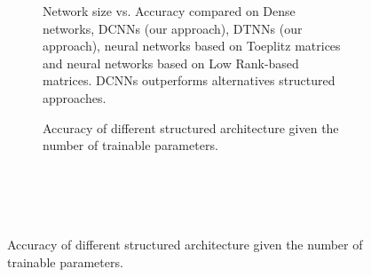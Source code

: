 


\begin{figure}
   \centering
   \begin{subfigure}[b]{0.49\textwidth}
       \centering
       
       \caption{Network size vs. Accuracy compared on Dense networks, DCNNs (our approach), DTNNs (our approach), neural networks based on Toeplitz matrices and neural networks based on Low Rank-based matrices. DCNNs outperforms alternatives structured approaches.}
       \label{figure:cifar10_type}
   \end{subfigure}
   \hfill
   \begin{subfigure}[b]{0.49\textwidth}
       \centering
       
       \caption{Accuracy of different structured architecture given the number of trainable parameters.~\\~\\~\\~\\~\\}
       \label{figure:cifar10_with_channels_xp}
   \end{subfigure}
\end{figure}




